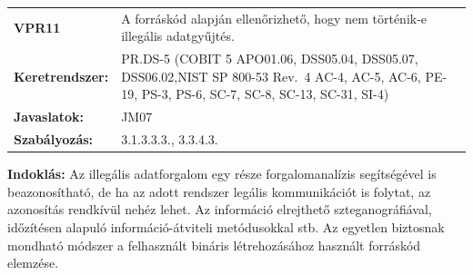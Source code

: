 \documentclass[12pt,magyar,a4paper,oneside]{scrreprt}
\begin{document}
\begin{longtable}[]{@{}ll@{}}
\toprule
\endhead
\begin{minipage}[t]{0.16\columnwidth}\raggedright
\textbf{VPR11}\strut
\end{minipage} & \begin{minipage}[t]{0.79\columnwidth}\raggedright
A forráskód alapján ellenőrizhető, hogy nem történik-e illegális
adatgyűjtés.\strut
\end{minipage}\tabularnewline
\begin{minipage}[t]{0.16\columnwidth}\raggedright
\textbf{Keretrendszer:}\strut
\end{minipage} & \begin{minipage}[t]{0.79\columnwidth}\raggedright
PR.DS-5 (COBIT 5 APO01.06, DSS05.04, DSS05.07, DSS06.02,NIST SP 800-53
Rev.~4 AC-4, AC-5, AC-6, PE-19, PS-3, PS-6, SC-7, SC-8, SC-13, SC-31,
SI-4)\strut
\end{minipage}\tabularnewline
\begin{minipage}[t]{0.16\columnwidth}\raggedright
\textbf{Javaslatok:}\strut
\end{minipage} & \begin{minipage}[t]{0.79\columnwidth}\raggedright
JM07\strut
\end{minipage}\tabularnewline
\begin{minipage}[t]{0.16\columnwidth}\raggedright
\textbf{Szabályozás:}\strut
\end{minipage} & \begin{minipage}[t]{0.79\columnwidth}\raggedright
3.1.3.3.3., 3.3.4.3.\strut
\end{minipage}\tabularnewline
\bottomrule
\end{longtable}

\textbf{Indoklás: } Az illegális adatforgalom egy része forgalomanalízis
segítségével is beazonosítható, de ha az adott rendszer legális
kommunikációt is folytat, az azonosítás rendkívül nehéz lehet. Az
információ elrejthető szteganográfiával, időzítésen alapuló
információ-átviteli metódusokkal stb. Az egyetlen biztosnak mondható
módszer a felhasznált bináris létrehozásához használt forráskód
elemzése.
\end{document}
